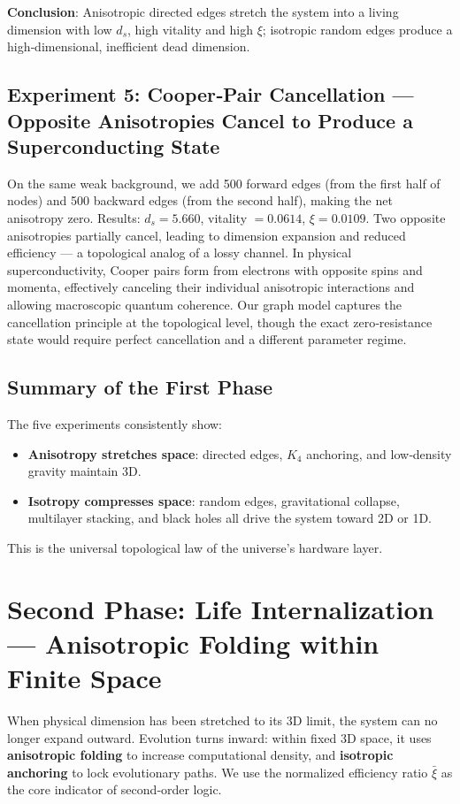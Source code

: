 \documentclass[12pt,a4paper]{article}
\begin{document}
\textbf{Conclusion}: Anisotropic directed edges stretch the system into a living dimension with low $d_s$, high vitality and high $\xi$; isotropic random edges produce a high‑dimensional, inefficient dead dimension.

\subsection{Experiment 5: Cooper‑Pair Cancellation — Opposite Anisotropies Cancel to Produce a Superconducting State}

On the same weak background, we add 500 forward edges (from the first half of nodes) and 500 backward edges (from the second half), making the net anisotropy zero. Results: $d_s=5.660$, vitality $=0.0614$, $\xi=0.0109$. Two opposite anisotropies partially cancel, leading to dimension expansion and reduced efficiency — a topological analog of a lossy channel. In physical superconductivity, Cooper pairs form from electrons with opposite spins and momenta, effectively canceling their individual anisotropic interactions and allowing macroscopic quantum coherence. Our graph model captures the cancellation principle at the topological level, though the exact zero‑resistance state would require perfect cancellation and a different parameter regime.

\subsection{Summary of the First Phase}

The five experiments consistently show:
\begin{itemize}
    \item \textbf{Anisotropy stretches space}: directed edges, $K_4$ anchoring, and low‑density gravity maintain 3D.
    \item \textbf{Isotropy compresses space}: random edges, gravitational collapse, multilayer stacking, and black holes all drive the system toward 2D or 1D.
\end{itemize}
This is the universal topological law of the universe's hardware layer.

\section{Second Phase: Life Internalization — Anisotropic Folding within Finite Space}

When physical dimension has been stretched to its 3D limit, the system can no longer expand outward. Evolution turns inward: within fixed 3D space, it uses \textbf{anisotropic folding} to increase computational density, and \textbf{isotropic anchoring} to lock evolutionary paths. We use the normalized efficiency ratio $\bar{\xi}$ as the core indicator of second‑order logic.
\end{document}
